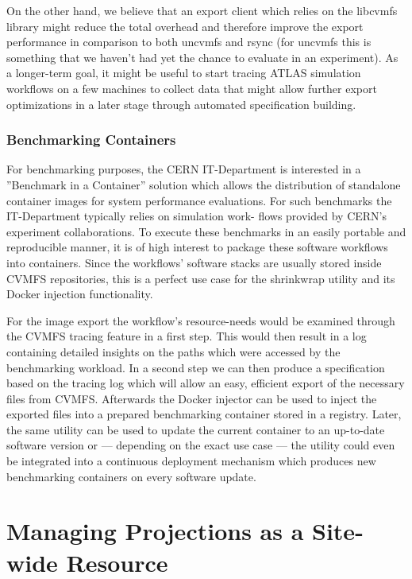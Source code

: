 \documentclass[conference]{IEEEtran}
\begin{document}
On the other hand, we believe that an export client which relies on the libcvmfs library might reduce the total overhead and therefore improve the export performance in comparison to both uncvmfs and rsync (for uncvmfs this is something that we haven’t had yet the chance to evaluate in an experiment).
As a longer-term goal, it might be useful to start tracing ATLAS simulation workflows on a few machines to collect data that might allow further export optimizations in a later stage through automated specification building.

\subsubsection{Benchmarking Containers}
For benchmarking purposes, the CERN IT-Department is interested in a ”Benchmark in a Container” solution which allows the distribution of standalone container images for system performance evaluations. For such benchmarks the IT-Department typically relies on simulation work- flows provided by CERN’s experiment collaborations. To execute these benchmarks in an easily portable and reproducible manner, it is of high interest to package these software workflows into containers. Since the workflows’ software stacks are usually stored inside CVMFS repositories, this is a perfect use case for the shrinkwrap utility and its Docker injection functionality.

For the image export the workflow’s resource-needs would be examined through the CVMFS tracing feature in a first step. This would then result in a log containing detailed insights on the paths which were accessed by the benchmarking workload. In a second step we can then produce a specification based on the tracing log which will allow an easy, efficient export of the necessary files from CVMFS. Afterwards the Docker injector can be used to inject the exported files into a prepared benchmarking container stored in a registry. Later, the same utility can be used to update the current container to an up-to-date software version or — depending on the exact use case — the utility could even be integrated into a continuous deployment mechanism which produces new benchmarking containers on every software update.

\section{Managing Projections as a Site-wide Resource}
\end{document}
